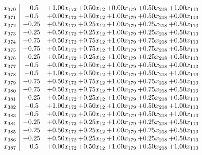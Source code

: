 \documentclass[8pt]{article}
\begin{document}
\[\begin{array}{c| c c@{\hskip 2pt} c@{\hskip 2pt} c@{\hskip 2pt} c@{\hskip 2pt} c@{\hskip 2pt} }
 x_{370}   &  -0.5 & +  1.00 x_{172} & +  0.50 x_{12} & +  0.00 x_{179} & +  0.50 x_{218} & +  1.00 x_{113}\\
 x_{371}   &  -0.5 & +  0.00 x_{172} & +  0.50 x_{12} & +  1.00 x_{179} & +  0.50 x_{218} & +  0.00 x_{113}\\
 x_{372}   &  -0.25 & +  0.50 x_{172} & +  0.25 x_{12} & +  1.00 x_{179} & +  0.25 x_{218} & +  0.50 x_{113}\\
 x_{373}   &  -0.25 & +  0.50 x_{172} & +  0.25 x_{12} & +  1.00 x_{179} & +  0.25 x_{218} & +  0.50 x_{113}\\
 x_{374}   &  -0.75 & +  0.50 x_{172} & +  0.75 x_{12} & +  1.00 x_{179} & +  0.75 x_{218} & +  0.50 x_{113}\\
 x_{375}   &  -0.75 & +  0.50 x_{172} & +  0.75 x_{12} & +  1.00 x_{179} & +  0.75 x_{218} & +  0.50 x_{113}\\
 x_{376}   &  -0.25 & +  0.50 x_{172} & +  0.25 x_{12} & +  1.00 x_{179} & +  0.25 x_{218} & +  0.50 x_{113}\\
 x_{377}   &  -0.5 & +  0.00 x_{172} & +  0.50 x_{12} & +  1.00 x_{179} & +  0.50 x_{218} & +  0.00 x_{113}\\
 x_{378}   &  -0.5 & +  1.00 x_{172} & +  0.50 x_{12} & +  1.00 x_{179} & +  0.50 x_{218} & +  1.00 x_{113}\\
 x_{379}   &  -0.75 & +  0.50 x_{172} & +  0.75 x_{12} & +  1.00 x_{179} & +  0.75 x_{218} & +  0.50 x_{113}\\
 x_{380}   &  -0.75 & +  0.50 x_{172} & +  0.75 x_{12} & +  1.00 x_{179} & +  0.75 x_{218} & +  0.50 x_{113}\\
 x_{381}   &  -0.25 & +  0.50 x_{172} & +  0.25 x_{12} & +  1.00 x_{179} & +  0.25 x_{218} & +  0.50 x_{113}\\
 x_{382}   &  -0.5 & +  1.00 x_{172} & +  0.50 x_{12} & +  1.00 x_{179} & +  0.50 x_{218} & +  1.00 x_{113}\\
 x_{383}   &  -0.5 & +  0.00 x_{172} & +  0.50 x_{12} & +  1.00 x_{179} & +  0.50 x_{218} & +  1.00 x_{113}\\
 x_{384}   &  -0.25 & +  0.50 x_{172} & +  0.25 x_{12} & +  1.00 x_{179} & +  0.25 x_{218} & +  0.50 x_{113}\\
 x_{385}   &  -0.25 & +  0.50 x_{172} & +  0.25 x_{12} & +  1.00 x_{179} & +  0.25 x_{218} & +  0.50 x_{113}\\
 x_{386}   &  -0.25 & +  0.50 x_{172} & +  0.25 x_{12} & +  1.00 x_{179} & +  0.25 x_{218} & +  0.50 x_{113}\\
 x_{387}   &  -0.5 & +  0.00 x_{172} & +  0.50 x_{12} & +  1.00 x_{179} & +  0.50 x_{218} & +  1.00 x_{113}\\

\end{array}\]
\end{document}
